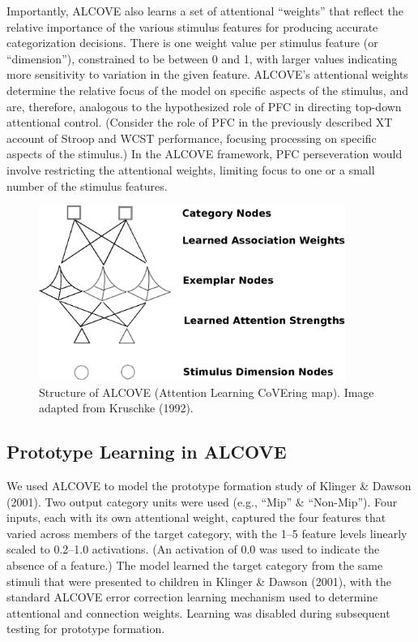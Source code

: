Importantly, ALCOVE also learns a set of attentional ``weights'' that reflect the relative importance of the various stimulus features for producing accurate categorization decisions. There is one weight value per stimulus feature (or ``dimension''), constrained to be between 0 and 1, with larger values indicating more sensitivity to variation in the given feature. ALCOVE's attentional weights determine the relative focus of the model on specific aspects of the stimulus, and are, therefore, analogous to the hypothesized role of PFC in directing top-down attentional control. (Consider the role of PFC in the previously described XT account of Stroop and WCST performance, focusing processing on specific aspects of the stimulus.) In the ALCOVE framework, PFC perseveration would involve restricting the attentional weights, limiting focus to one or a small number of the stimulus features.  

\begin{figure}[ht]
\begin{center}
	\includegraphics[width=100mm]{figures/alcove.eps}
\end{center}
\caption{Structure of ALCOVE (Attention Learning CoVEring map). Image adapted from Kruschke (1992).}
\label{alcove}
\end{figure} 

\subsection{Prototype Learning in ALCOVE}
We used ALCOVE to model the prototype formation study of Klinger \& Dawson (2001). Two output category units were used (e.g., ``Mip'' \& ``Non-Mip''). Four inputs, each with its own attentional weight, captured the four features that varied across members of the target category, with the 1--5 feature levels linearly scaled to 0.2--1.0 activations. (An activation of 0.0 was used to indicate the absence of a feature.) The model learned the target category from the same stimuli that were presented to children in Klinger \& Dawson (2001), with the standard ALCOVE error correction learning mechanism used to determine attentional and connection weights. Learning was disabled during subsequent testing for prototype formation.

